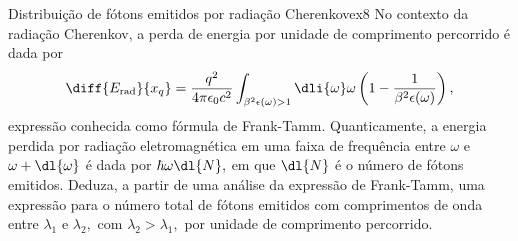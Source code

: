 \begin{exercício}{Distribuição de fótons emitidos por radiação Cherenkov}{ex8}
    No contexto da radiação Cherenkov, a perda de energia por unidade de comprimento percorrido é dada por
    \begin{equation*}
        \diff{E_\mathrm{rad}}{x_q} = \frac{q^2}{4\pi \epsilon_0 c^2} \int_{\beta^2 \epsilon(\omega) > 1} \dli{\omega}\omega\left(1 - \frac{1}{\beta^2 \epsilon(\omega)}\right),
    \end{equation*}
    expressão conhecida como fórmula de Frank-Tamm. Quanticamente, a energia perdida por radiação eletromagnética em uma faixa de frequência entre \(\omega\) e \(\omega + \dl{\omega}\) é dada por \(\hbar \omega \dl{N},\) em que \(\dl{N}\) é o número de fótons emitidos. Deduza, a partir de uma análise da expressão de Frank-Tamm, uma expressão para o número total de fótons emitidos com comprimentos de onda entre \(\lambda_1\) e \(\lambda_2,\) com \(\lambda_2 > \lambda_1,\) por unidade de comprimento percorrido.
\end{exercício}
